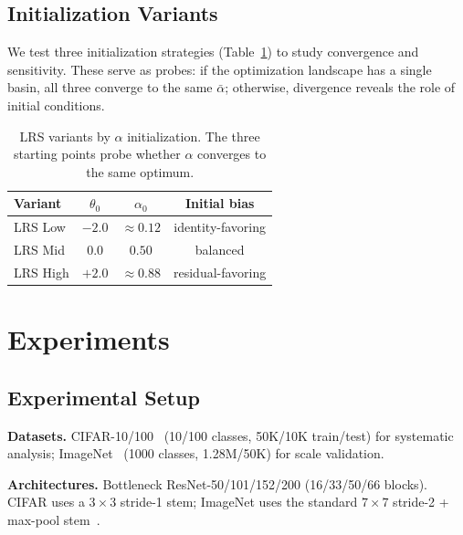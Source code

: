 \documentclass{bmvc2k}
\begin{document}
\subsection{Initialization Variants}

We test three initialization strategies (Table~\ref{tab:init_variants}) to study convergence and sensitivity. These serve as probes: if the optimization landscape has a single basin, all three converge to the same $\bar{\alpha}$; otherwise, divergence reveals the role of initial conditions.

\begin{table}[!ht]
\centering
\small
\caption{LRS variants by $\alpha$ initialization. The three starting points probe whether $\alpha$ converges to the same optimum.}
\label{tab:init_variants}
\begin{tabular}{lccc}
\toprule
\textbf{Variant} & $\theta_0$ & $\alpha_0$ & \textbf{Initial bias} \\
\midrule
LRS Low  & $-2.0$ & $\approx 0.12$ & identity-favoring \\
LRS Mid  & $0.0$  & $0.50$         & balanced \\
LRS High & $+2.0$ & $\approx 0.88$ & residual-favoring \\
\bottomrule
\end{tabular}
\end{table}

\section{Experiments}
\label{sec:experiments}

\subsection{Experimental Setup}
\label{sec:setup}

\textbf{Datasets.} CIFAR-10/100~\cite{krizhevsky2009learning} (10/100 classes, 50K/10K train/test) for systematic analysis; ImageNet~\cite{russakovsky2015imagenet} (1000 classes, 1.28M/50K) for scale validation.

\textbf{Architectures.} Bottleneck ResNet-50/101/152/200 (16/33/50/66 blocks). CIFAR uses a $3{\times}3$ stride-1 stem; ImageNet uses the standard $7{\times}7$ stride-2 + max-pool stem~\cite{he2016deep}.
\end{document}
